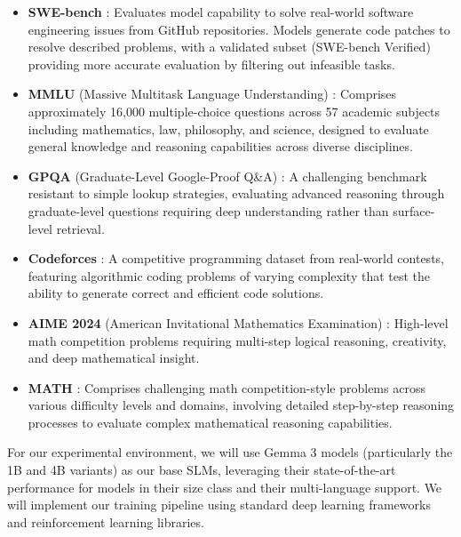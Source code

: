 \documentclass[11pt, oneside]{article}   	%
\begin{document}
\begin{itemize}
	\item \textbf{SWE-bench} \cite{jimenez2024swebenchlanguagemodelsresolve}: Evaluates model capability to solve real-world software engineering issues from GitHub repositories. Models generate code patches to resolve described problems, with a validated subset (SWE-bench Verified) providing more accurate evaluation by filtering out infeasible tasks.

	\item \textbf{MMLU} (Massive Multitask Language Understanding) \cite{hendrycks2021measuringmassivemultitasklanguage}: Comprises approximately 16,000 multiple-choice questions across 57 academic subjects including mathematics, law, philosophy, and science, designed to evaluate general knowledge and reasoning capabilities across diverse disciplines.

	\item \textbf{GPQA} (Graduate-Level Google-Proof Q\&A) \cite{rein2023gpqagraduatelevelgoogleproofqa}: A challenging benchmark resistant to simple lookup strategies, evaluating advanced reasoning through graduate-level questions requiring deep understanding rather than surface-level retrieval.

	\item \textbf{Codeforces} \cite{quan2025codeelobenchmarkingcompetitionlevelcode}: A competitive programming dataset from real-world contests, featuring algorithmic coding problems of varying complexity that test the ability to generate correct and efficient code solutions.

	\item \textbf{AIME 2024} (American Invitational Mathematics Examination) \cite{deepseekai2025deepseekr1incentivizingreasoningcapability}: High-level math competition problems requiring multi-step logical reasoning, creativity, and deep mathematical insight.

	\item \textbf{MATH} \cite{hendrycks2021measuringmathematicalproblemsolving}: Comprises challenging math competition-style problems across various difficulty levels and domains, involving detailed step-by-step reasoning processes to evaluate complex mathematical reasoning capabilities.
\end{itemize}

For our experimental environment, we will use Gemma 3 models (particularly the 1B and 4B variants) as our base SLMs, leveraging their state-of-the-art performance for models in their size class and their multi-language support. We will implement our training pipeline using standard deep learning frameworks and reinforcement learning libraries.
\end{document}
